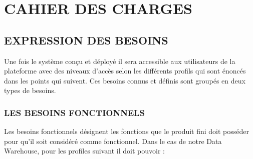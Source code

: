 \chapter{CAHIER DES CHARGES}


\section{EXPRESSION DES BESOINS}
Une fois le système conçu et déployé il sera accessible aux utilisateurs de la plateforme avec des niveaux d’accès selon les différents profils qui sont énoncés dans les points qui suivent. Ces besoins connus et définis sont groupés en deux types de besoins.


 \subsection{LES BESOINS FONCTIONNELS}
 
 Les besoins fonctionnels désignent les fonctions que le produit fini doit posséder pour qu’il soit considéré comme fonctionnel. Dans le cas de notre Data Warehouse, pour les profiles suivant il doit pouvoir :
 
